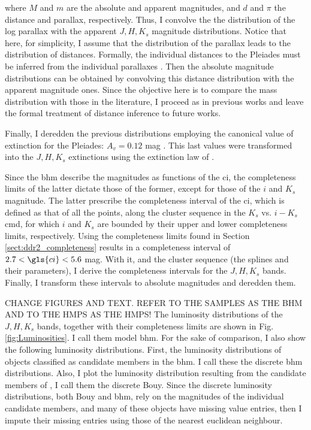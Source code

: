 where $M$ and $m$ are the absolute and apparent magnitudes, and $d$ and $\pi$ the distance and parallax, respectively. Thus, I convolve the the distribution of the log parallax with the apparent $J,H,K_s$ magnitude distributions. Notice that here, for simplicity, I assume that the distribution of the parallax leads to the distribution of distances. Formally, the individual distances to the Pleiades must be inferred from the individual parallaxes  \cite[see for example][]{2016ApJ...833..119A}. Then the absolute magnitude distributions can be obtained by convolving this distance distribution with the apparent magnitude ones. Since the objective here is to compare the mass distribution with those in the literature, I proceed as in previous works and leave the formal treatment of distance inference to future works.

Finally, I deredden the previous distributions employing the canonical value of extinction for the Pleiades: $A_v=0.12$ mag \citep{Guthrie1987}. This last values were transformed into the $J,H,K_s$ extinctions using the extinction law of \citet{Cardelli1989}.

Since the \gls{bhm} describe the magnitudes as functions of the \gls{ci}, the completeness limits of the latter dictate those of the former, except for those of the $i$ and $K_s$ magnitude. The latter prescribe the completeness interval of the \gls{ci}, which is defined as that of all the points, along the cluster sequence in the $K_s$ vs. $i-K_s$ \gls{cmd}, for which $i$ and $K_s$ are bounded by their upper and lower completeness limits, respectively. Using the completeness limits found in Section \ref{sect:ddr2_completeness} results in a completeness interval of  $2.7<\gls{ci}<5.6$ mag. With it, and the cluster sequence (the splines and their parameters), I derive the completeness intervals for the $J,H,K_s$ bands. Finally, I transform these intervals to absolute magnitudes and deredden them. 


CHANGE FIGURES AND TEXT. REFER TO THE SAMPLES AS THE BHM AND TO THE HMPS AS THE HMPS!
The luminosity distributions of the $J,H,K_s$ bands, together with their completeness limits are shown in Fig. \ref{fig:Luminosities}. I call them model \gls{bhm}. For the sake of comparison, I also show the following luminosity distributions. First, the luminosity distributions of objects classified as candidate members in the \gls{bhm}. I call these the discrete \gls{bhm} distributions. Also, I plot the luminosity distribution resulting from the candidate members of \citet{Bouy2015}, I call them the discrete Bouy. Since the discrete luminosity distributions, both Bouy and \gls{bhm}, rely on the magnitudes of the individual candidate members, and many of these objects have missing value entries, then I impute their missing entries using those of the nearest euclidean neighbour. 

